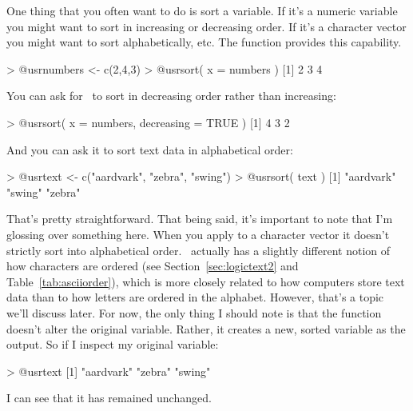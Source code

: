 One thing that you often want to do is sort a variable. If it's a numeric variable you might want to sort in increasing or decreasing order. If it's a character vector you might want to sort alphabetically, etc. The  function provides this capability. 
\begin{rblock1}
> @usr{numbers <- c(2,4,3)}
> @usr{sort( x = numbers )}
[1] 2 3 4
\end{rblock1}
You can ask for \R\ to sort in decreasing order rather than increasing:
\begin{rblock1}
> @usr{sort( x = numbers, decreasing = TRUE )}
[1] 4 3 2
\end{rblock1}
And you can ask it to sort text data in alphabetical order:
\begin{rblock1}
> @usr{text <- c("aardvark", "zebra", "swing")}
> @usr{sort( text )}
[1] "aardvark" "swing"    "zebra"  
\end{rblock1}
That's pretty straightforward. That being said, it's important to note that I'm glossing over something here. When you apply  to a character vector it doesn't strictly sort into alphabetical order. \R\ actually has a slightly different notion of how characters are ordered (see Section~\ref{sec:logictext2} and Table~\ref{tab:asciiorder}), which is more closely related to how computers store text data than to how letters are ordered in the alphabet. However, that's a topic we'll discuss later. For now, the only thing I should note is that the  function doesn't alter the original variable. Rather, it creates a new, sorted variable as the output. So if I inspect my original  variable:
\begin{rblock1}
> @usr{text}
[1] "aardvark" "zebra"    "swing"   
\end{rblock1}
I can see that it has remained unchanged.


